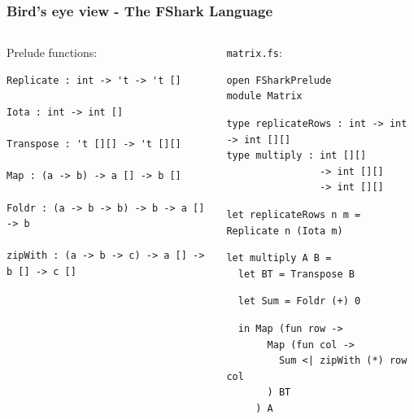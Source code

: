 \documentclass[10pt, compress]{beamer}
\begin{document}
\begin{frame}
  \frametitle{Bird's eye view - The FShark Language}
\begin{columns}[T] %
\begin{column}{.48\textwidth}
Prelude functions:\\
\begin{verbatim}
Replicate : int -> 't -> 't []

Iota : int -> int []

Transpose : 't [][] -> 't [][]

Map : (a -> b) -> a [] -> b []

Foldr : (a -> b -> b) -> b -> a [] -> b

zipWith : (a -> b -> c) -> a [] -> b [] -> c []
\end{verbatim}
\end{column}%
\hfill%
\pause
\begin{column}{.48\textwidth}
\texttt{matrix.fs}:
\begin{verbatim}
open FSharkPrelude
module Matrix
\end{verbatim}
\pause
\begin{verbatim}
type replicateRows : int -> int -> int [][] 
type multiply : int [][] 
                -> int [][] 
                -> int [][]
\end{verbatim}
\pause
\begin{verbatim}
let replicateRows n m = Replicate n (Iota m)
\end{verbatim}
\pause
\begin{verbatim}
let multiply A B =
  let BT = Transpose B
\end{verbatim}
\pause
\begin{verbatim}
  let Sum = Foldr (+) 0
\end{verbatim}
\pause
\begin{verbatim}
  in Map (fun row ->
       Map (fun col -> 
         Sum <| zipWith (*) row col
       ) BT
     ) A
\end{verbatim}
\end{column}%
\end{columns}
\end{frame}
\end{document}
